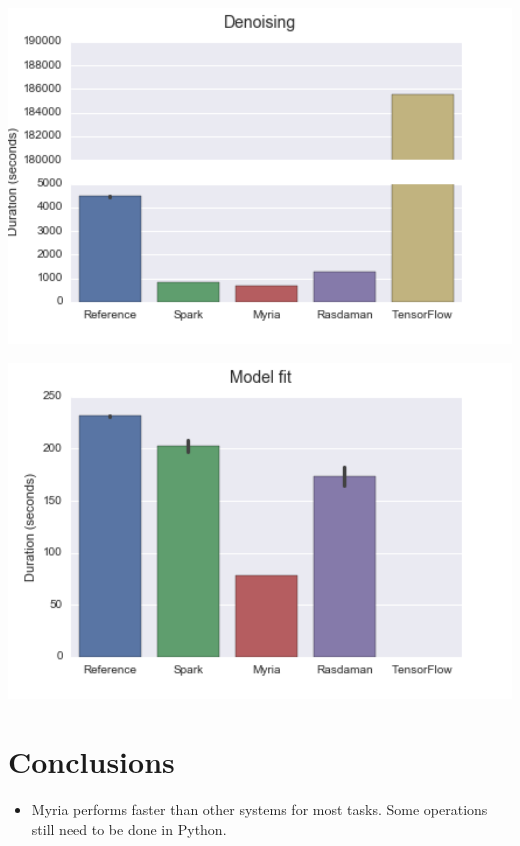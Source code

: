 \documentclass[a0,landscape]{a0poster}
\begin{document}
\begin{multicols}{3}
\begin{minipage}[b]{0.5\linewidth}
  \includegraphics[width=17cm]{Denoising.png}
\end{minipage}
\begin{minipage}[b]{0.5\linewidth}
  \includegraphics[width=17cm]{ModelFit.png}
\end{minipage}



\color{SaddleBrown} %

\section*{Conclusions}

\begin{itemize}

\item Myria performs faster than other systems for most tasks. Some operations still need to be done in Python.


\end{itemize}
\end{multicols}
\end{document}
